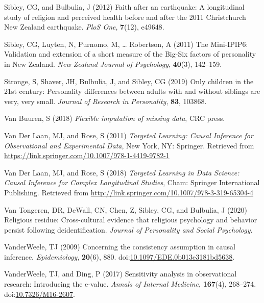 \documentclass[
  singlecolumn]{article}
\newlength{\cslhangindent}
\newenvironment{CSLReferences}[2] %
 {\begin{list}{}{%
  \setlength{\itemindent}{0pt}
  \setlength{\leftmargin}{0pt}
  \setlength{\parsep}{0pt}
  \ifodd #1
   \setlength{\leftmargin}{\cslhangindent}
   \setlength{\itemindent}{-1\cslhangindent}
  \fi
  \setlength{\itemsep}{#2\baselineskip}}}
 {\end{list}}
\begin{document}
\begin{CSLReferences}{1}{0}
Sibley, CG, and Bulbulia, J (2012) Faith after an earthquake: A
longitudinal study of religion and perceived health before and after the
2011 {C}hristchurch {N}ew {Z}ealand earthquake. \emph{PloS One},
\textbf{7}(12), e49648.

Sibley, CG, Luyten, N, Purnomo, M, \ldots{} Robertson, A (2011) The
Mini-IPIP6: Validation and extension of a short measure of the Big-Six
factors of personality in New Zealand. \emph{New Zealand Journal of
Psychology}, \textbf{40}(3), 142--159.

Stronge, S, Shaver, JH, Bulbulia, J, and Sibley, CG (2019) Only children
in the 21st century: Personality differences between adults with and
without siblings are very, very small. \emph{Journal of Research in
Personality}, \textbf{83}, 103868.

Van Buuren, S (2018) \emph{Flexible imputation of missing data}, CRC
press.

Van Der Laan, MJ, and Rose, S (2011) \emph{Targeted Learning: Causal
Inference for Observational and Experimental Data}, New York, NY:
Springer. Retrieved from
\url{https://link.springer.com/10.1007/978-1-4419-9782-1}

Van Der Laan, MJ, and Rose, S (2018) \emph{Targeted Learning in Data
Science: Causal Inference for Complex Longitudinal Studies}, Cham:
Springer International Publishing. Retrieved from
\url{http://link.springer.com/10.1007/978-3-319-65304-4}

Van Tongeren, DR, DeWall, CN, Chen, Z, Sibley, CG, and Bulbulia, J
(2020) Religious residue: Cross-cultural evidence that religious
psychology and behavior persist following deidentification.
\emph{Journal of Personality and Social Psychology}.

VanderWeele, TJ (2009) Concerning the consistency assumption in causal
inference. \emph{Epidemiology}, \textbf{20}(6), 880.
doi:\href{https://doi.org/10.1097/EDE.0b013e3181bd5638}{10.1097/EDE.0b013e3181bd5638}.

VanderWeele, TJ, and Ding, P (2017) Sensitivity analysis in
observational research: Introducing the e-value. \emph{Annals of
Internal Medicine}, \textbf{167}(4), 268--274.
doi:\href{https://doi.org/10.7326/M16-2607}{10.7326/M16-2607}.


\end{CSLReferences}
\end{document}
